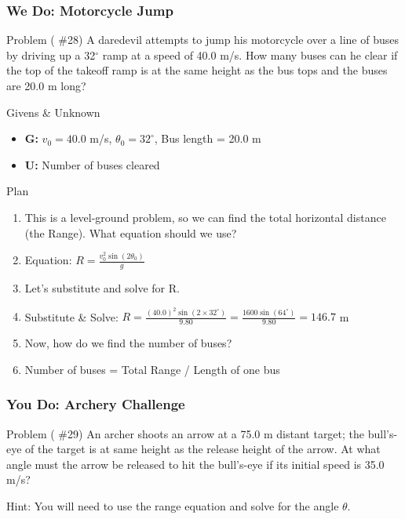 \documentclass{beamer}
\begin{document}
\begin{frame}
\frametitle{We Do: Motorcycle Jump}
\begin{block}{Problem ( \#28)}
A daredevil attempts to jump his motorcycle over a line of buses by driving up a 32$^\circ$ ramp at a speed of 40.0 m/s. How many buses can he clear if the top of the takeoff ramp is at the same height as the bus tops and the buses are 20.0 m long?
\end{block}
\pause
\begin{block}{Givens \& Unknown}
\begin{itemize}
    \item \textbf{G:} $v_0 = 40.0$ m/s, $\theta_0 = 32^\circ$, Bus length = 20.0 m
    \item \textbf{U:} Number of buses cleared
\end{itemize}
\end{block}
\end{frame}

\begin{frame}
\begin{block}{Plan}
\begin{enumerate}
    \item This is a level-ground problem, so we can find the total horizontal distance (the Range). What equation should we use?
    \item \alert{Equation:} $R = \frac{v_0^2 \sin(2\theta_0)}{g}$
    \pause
    \item Let's substitute and solve for R.
    \item \alert{Substitute \& Solve:} $R = \frac{(40.0)^2 \sin(2 \times 32^\circ)}{9.80} = \frac{1600 \sin(64^\circ)}{9.80} = 146.7$ m
    \pause
    \item Now, how do we find the number of buses?
    \item \alert{Number of buses} = Total Range / Length of one bus
\end{enumerate}
\end{block}
\end{frame}

\begin{frame}
\frametitle{You Do: Archery Challenge}
\begin{block}{Problem ( \#29)}
An archer shoots an arrow at a 75.0 m distant target; the bull's-eye of the target is at same height as the release height of the arrow. At what angle must the arrow be released to hit the bull's-eye if its initial speed is 35.0 m/s?
\end{block}
\begin{center}
\alert{Hint: You will need to use the range equation and solve for the angle $\theta$.}
\end{center}
\end{frame}
\end{document}

